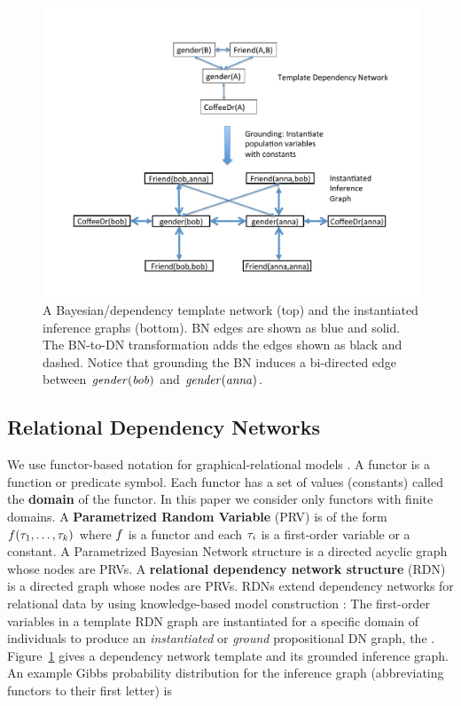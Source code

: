 \documentclass[runningheads,a4paper]{llncs}
\newcommand{\fixneeded}[1]{\textbf{[\footnotesize #1]}}
\begin{document}
\begin{figure}[htbp]
\begin{center}
\includegraphics[width = 0.7 \textwidth]{figures/dn}
\caption{A Bayesian/dependency template network (top) and the instantiated inference graphs (bottom). BN edges are shown as blue and solid. The BN-to-DN transformation adds the edges shown as black and dashed. Notice that grounding the BN induces a bi-directed edge between $\it{gender}(bob)$ and $\it{gender}(anna)$. \label{fig:dn}}
\end{center}
\end{figure}

 
\subsection{Relational Dependency Networks} We use  functor-based notation for graphical-relational models \cite{Poole2003}. A functor is a function or predicate symbol. Each functor has a set of values (constants) called the \textbf{domain} of the functor. In this paper we consider only functors with finite domains. A \textbf{Parametrized Random Variable} (PRV) is of the form $f(\tau_{1},\ldots,\tau_{k})$ where $f$ is a functor 
and each $\tau_{i}$ is a first-order variable or a constant.
 A Parametrized Bayesian Network structure is a directed acyclic graph whose nodes are PRVs. A \textbf{relational dependency network structure} (RDN) is a directed graph whose nodes are PRVs.
RDNs extend dependency networks for relational data by using knowledge-based model construction \cite{Neville2007}:
%
%
 The first-order variables in a template RDN graph are instantiated for a specific domain of individuals to produce an {\em  instantiated} or {\em ground} propositional DN graph, the . Figure~\ref{fig:dn} gives a dependency network template and its grounded inference graph. An example Gibbs probability distribution for the inference graph (abbreviating functors to their first letter) is
\end{document}
